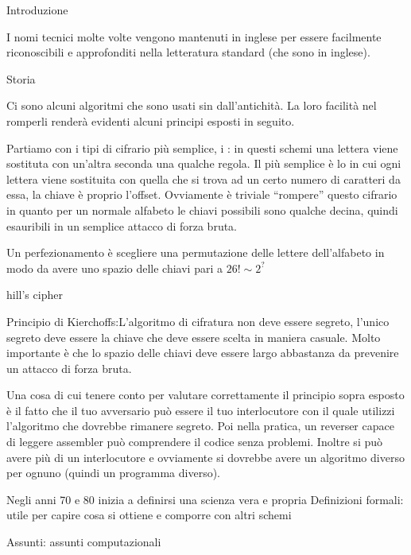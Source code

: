 

\readtocfile

\capitolo Introduzione

I nomi tecnici molte volte vengono mantenuti in inglese per essere facilmente
riconoscibili e approfonditi nella letteratura standard (che sono in inglese).

\sezione Storia

Ci sono alcuni algoritmi che sono usati sin dall'antichit\`a. La loro facilit\`a nel
romperli render\`a evidenti alcuni principi esposti in seguito.

Partiamo con i tipi di cifrario pi\`u semplice, i :
in questi schemi una lettera viene sostituta con un'altra seconda una qualche regola.
Il pi\`u semplice \`e lo  in cui ogni lettera viene sostituita
con quella che si trova ad un certo numero di caratteri da essa, la chiave \`e proprio
l'offset. Ovviamente \`e triviale ``rompere'' questo cifrario in quanto per un normale
alfabeto le chiavi possibili sono qualche decina, quindi esauribili in un semplice
attacco di forza bruta.

Un perfezionamento \`e scegliere una permutazione delle lettere dell'alfabeto in modo
da avere uno spazio delle chiavi pari a $26!\sim 2^?$

\todo hill's cipher

\ddefinizione Principio di Kierchoffs:L'algoritmo di cifratura non deve essere segreto,
l'unico segreto deve essere la chiave che deve essere scelta in maniera casuale. Molto
importante \`e che lo spazio delle chiavi deve essere largo abbastanza da prevenire
un attacco di forza bruta.

Una cosa di cui tenere conto per valutare correttamente il principio sopra esposto \`e
il fatto che il tuo avversario pu\`o essere il tuo interlocutore con il quale utilizzi
l'algoritmo che dovrebbe rimanere segreto. Poi nella pratica, un reverser capace di leggere
assembler pu\`o comprendere il codice senza problemi. Inoltre si pu\`o avere pi\`u di un interlocutore e ovviamente
si dovrebbe avere un algoritmo diverso per ognuno (quindi un programma diverso).

Negli anni 70 e 80 inizia a definirsi una scienza vera e propria
\medskip
\voce Definizioni formali: utile per capire cosa si ottiene e comporre con altri schemi

\voce Assunti: assunti computazionali


